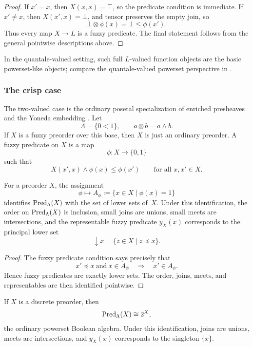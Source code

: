 \begin{proof}
    If \(x'=x\), then \(X(x,x)=\top\), so the predicate condition is immediate. If \(x'\neq x\), then \(X(x',x)=\bot\), and tensor preserves the empty join, so
    \[
        \bot\otimes \phi(x)=\bot\leq \phi(x').
    \]
    Thus every map \(X\to L\) is a fuzzy predicate. The final statement follows from the general pointwise descriptions above.
\end{proof}

In the quantale-valued setting, such full \(L\)-valued function objects are the basic powerset-like objects; compare the quantale-valued powerset perspective in \cite{ShenZhao2024PowersetMonad}.

\subsubsection{The crisp case}

The two-valued case is the ordinary posetal specialization of enriched presheaves and the Yoneda embedding \cite[Section~1.9]{Kelly1982BasicConcepts}. Let
\[
    \Lambda=\{0<1\},
    \qquad
    a\otimes b=a\wedge b.
\]
If \(X\) is a fuzzy preorder over this base, then \(X\) is just an ordinary preorder. A fuzzy predicate on \(X\) is a map
\[
    \phi:X\to \{0,1\}
\]
such that
\[
    X(x',x)\wedge \phi(x)\leq \phi(x')
    \qquad
    \text{for all }x,x'\in X.
\]

\begin{proposition}
\label{prop:crisp-predicate-algebra}
    For a preorder \(X\), the assignment
    \[
        \phi\longmapsto A_\phi:=\{x\in X\mid \phi(x)=1\}
    \]
    identifies \(\mathrm{Pred}_\Lambda(X)\) with the set of lower sets of~\(X\). Under this identification, the order on \(\mathrm{Pred}_\Lambda(X)\) is inclusion, small joins are unions, small meets are intersections, and the representable fuzzy predicate \(y_X(x)\) corresponds to the principal lower set
    \[
        \downarrow x=\{z\in X\mid z\preceq x\}.
    \]
\end{proposition}

\begin{proof}
    The fuzzy predicate condition says precisely that
    \[
        x'\preceq x
        \ \text{and}\
        x\in A_\phi
        \quad\Longrightarrow\quad
        x'\in A_\phi.
    \]
    Hence fuzzy predicates are exactly lower sets. The order, joins, meets, and representables are then identified pointwise.
\end{proof}

\begin{corollary}
\label{cor:crisp-discrete-predicate-algebra}
    If \(X\) is a discrete preorder, then
    \[
        \mathrm{Pred}_\Lambda(X)\cong 2^X,
    \]
    the ordinary powerset Boolean algebra. Under this identification, joins are unions, meets are intersections, and \(y_X(x)\) corresponds to the singleton \(\{x\}\).
\end{corollary}

